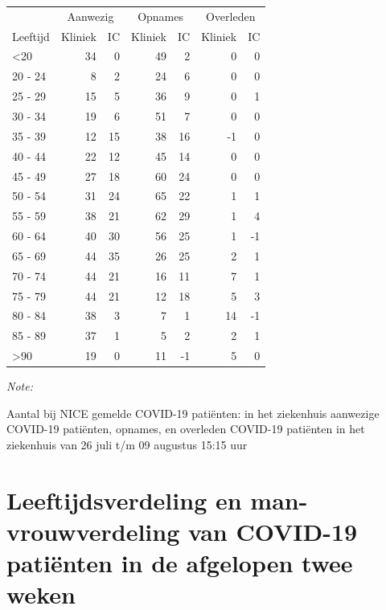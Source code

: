 \documentclass[
  english,
  man,floatsintext]{apa6}
\begin{document}
\begin{table}
\centering\begingroup\fontsize{10}{12}\selectfont

\begin{threeparttable}
\begin{tabular}{lrrrrrr}
\toprule
\multicolumn{1}{c}{ } & \multicolumn{2}{c}{Aanwezig} & \multicolumn{2}{c}{Opnames} & \multicolumn{2}{c}{Overleden} \\
\cmidrule(l{3pt}r{3pt}){2-3} \cmidrule(l{3pt}r{3pt}){4-5} \cmidrule(l{3pt}r{3pt}){6-7}
Leeftijd & Kliniek & IC & Kliniek & IC & Kliniek & IC\\
\midrule
<20 & 34 & 0 & 49 & 2 & 0 & 0\\
20 - 24 & 8 & 2 & 24 & 6 & 0 & 0\\
25 - 29 & 15 & 5 & 36 & 9 & 0 & 1\\
30 - 34 & 19 & 6 & 51 & 7 & 0 & 0\\
35 - 39 & 12 & 15 & 38 & 16 & -1 & 0\\
40 - 44 & 22 & 12 & 45 & 14 & 0 & 0\\
45 - 49 & 27 & 18 & 60 & 24 & 0 & 0\\
50 - 54 & 31 & 24 & 65 & 22 & 1 & 1\\
55 - 59 & 38 & 21 & 62 & 29 & 1 & 4\\
60 - 64 & 40 & 30 & 56 & 25 & 1 & -1\\
65 - 69 & 44 & 35 & 26 & 25 & 2 & 1\\
70 - 74 & 44 & 21 & 16 & 11 & 7 & 1\\
75 - 79 & 44 & 21 & 12 & 18 & 5 & 3\\
80 - 84 & 38 & 3 & 7 & 1 & 14 & -1\\
85 - 89 & 37 & 1 & 5 & 2 & 2 & 1\\
>90 & 19 & 0 & 11 & -1 & 5 & 0\\
\bottomrule
\end{tabular}
\begin{tablenotes}
\item \textit{Note: } 
\item Aantal bij NICE gemelde COVID-19 patiënten: in het ziekenhuis aanwezige COVID-19 patiënten, opnames, en overleden COVID-19 patiënten in het ziekenhuis van 26 juli t/m 09 augustus 15:15 uur
\end{tablenotes}
\end{threeparttable}
\endgroup{}
\end{table}

\newpage

\hypertarget{leeftijdsverdeling-en-man-vrouwverdeling-van-covid-19-patiuxebnten-in-de-afgelopen-twee-weken}{%
\section{Leeftijdsverdeling en man-vrouwverdeling van COVID-19 patiënten in de afgelopen twee weken}\label{leeftijdsverdeling-en-man-vrouwverdeling-van-covid-19-patiuxebnten-in-de-afgelopen-twee-weken}}
\end{document}
